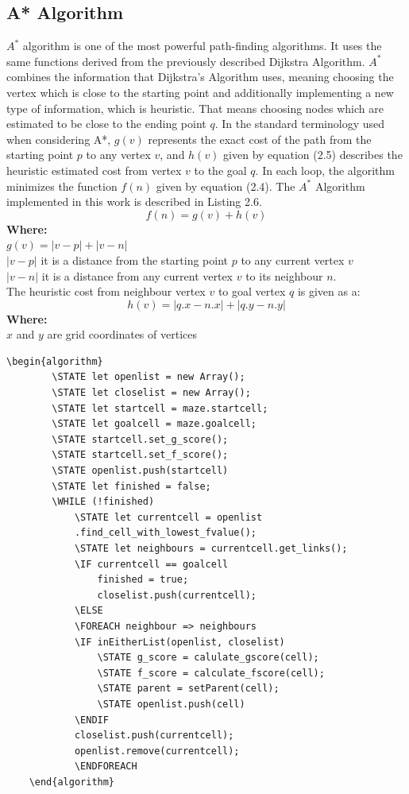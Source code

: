 \subsection{A* Algorithm}
$A^*$ algorithm is one of the most powerful path-finding algorithms. It uses the same functions derived from the previously described Dijkstra Algorithm. 
$A^*$ combines the information that Dijkstra’s Algorithm uses, meaning choosing the vertex which is close to the starting point and additionally
implementing a new type of information, which is heuristic. That means choosing nodes which are estimated to be close to the ending point $q$. 
In the standard terminology used when considering A*, $g(v)$ represents the exact cost of the path from the starting point $p$ to any vertex $v$, and
$h(v)$ given by equation (2.5) describes the heuristic estimated cost from vertex $v$ to the goal $q$. In each loop, the algorithm minimizes the function
$f(n)$ given by equation (2.4). The $A^*$ Algorithm implemented in this work is described in Listing 2.6.
\begin{equation}
f(n) = g(v) + h(v)
\end{equation}
\textbf{Where:}\\
$g(v)= |v - p| + |v - n|$\\
$|v - p|$ it is a distance from the starting point $p$ to any current vertex $v$\\
$|v - n|$ it is a distance from any current vertex $v$ to its neighbour $n$.\\
\newline
The heuristic cost from neighbour vertex $v$ to goal vertex $q$ is given as a:
\begin{equation}
h(v) = |q.x - n.x| + |q.y - n.y|
\end{equation}
\textbf{Where:}\\
$x$ and $y$ are grid coordinates of vertices\\

\begin{lstlisting}[caption={Pseudocode for a A* algorithm. Source: developped by the author, based on~\cite{19}.}]
	\begin{algorithm}
		\STATE let openlist = new Array();
		\STATE let closelist = new Array();
		\STATE let startcell = maze.startcell;
		\STATE let goalcell = maze.goalcell;
		\STATE startcell.set_g_score();
		\STATE startcell.set_f_score();
		\STATE openlist.push(startcell)
		\STATE let finished = false;
		\WHILE (!finished)
			\STATE let currentcell = openlist    
			.find_cell_with_lowest_fvalue();
			\STATE let neighbours = currentcell.get_links();
			\IF currentcell == goalcell
				finished = true;
				closelist.push(currentcell);
			\ELSE 
			\FOREACH neighbour => neighbours	
			\IF inEitherList(openlist, closelist)
				\STATE g_score = calulate_gscore(cell);
				\STATE f_score = calculate_fscore(cell);
				\STATE parent = setParent(cell);
				\STATE openlist.push(cell)
			\ENDIF
			closelist.push(currentcell);
			openlist.remove(currentcell);
	    	\ENDFOREACH
	\end{algorithm}
	\end{lstlisting}
%